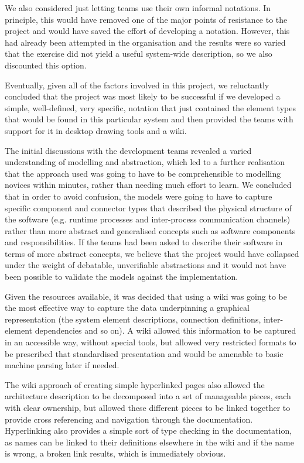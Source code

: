  We also considered just letting teams use their own informal notations.  In principle, this would have removed one of the major points of resistance to the project and would have saved the effort of developing a notation.  However, this had already been attempted in the organisation and the results were so varied that the exercise did not yield a useful system-wide description, so we also discounted this option.

  Eventually, given all of the factors involved in this project, we reluctantly concluded that the project was most likely to be successful if we developed a simple, well-defined, very specific, notation that just contained the element types that would be found in this particular system and then provided the teams with support for it in desktop drawing tools and a wiki.

  The initial discussions with the development teams revealed a varied understanding of modelling and abstraction, which led to a further realisation that the approach used was going to have to be comprehensible to modelling novices within minutes, rather than needing much effort to learn.  We concluded that in order to avoid confusion, the models were going to have to capture specific component and connector types that described the physical structure of the software (e.g. runtime processes and inter-process communication channels) rather than more abstract and generalised concepts such as software components and responsibilities.  If the teams had been asked to describe their software in terms of more abstract concepts, we believe that the project would have collapsed under the weight of debatable, unverifiable abstractions and it would not have been possible to validate the models against the implementation.

  Given the resources available, it was decided that using a wiki was going to be the most effective way to capture the data underpinning a graphical representation (the system element descriptions, connection definitions, inter-element dependencies and so on).  A wiki allowed this information to be captured in an accessible way, without special tools, but allowed very restricted formats to be prescribed that standardised presentation and would be amenable to basic machine parsing later if needed.

  The wiki approach of creating simple hyperlinked pages also allowed the architecture description to be decomposed into a set of manageable pieces, each with clear ownership, but allowed these different pieces to be linked together to provide cross referencing and navigation through the documentation.  Hyperlinking also provides a simple sort of type checking in the documentation, as names can be linked to their definitions elsewhere in the wiki and if the name is wrong, a broken link results, which is immediately obvious.


